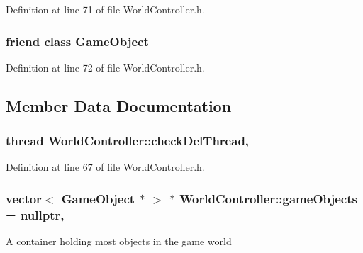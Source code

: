 Definition at line 71 of file World\-Controller.\-h.

\hypertarget{class_world_controller_a00df87c957d8f7ee0fc51f07a0542f4a}{
\subsubsection[{Game\-Object}]{\setlength{\rightskip}{0pt plus 5cm}friend class {\bf Game\-Object}\hspace{0.3cm}{\ttfamily [friend]}}}\label{class_world_controller_a00df87c957d8f7ee0fc51f07a0542f4a}


Definition at line 72 of file World\-Controller.\-h.



\subsection{Member Data Documentation}
\hypertarget{class_world_controller_ab8fb8ee7100a17d3a6237ce8ac5a15e2}{
\subsubsection[{check\-Del\-Thread}]{\setlength{\rightskip}{0pt plus 5cm}thread World\-Controller\-::check\-Del\-Thread\hspace{0.3cm}{\ttfamily [static]}, {\ttfamily [protected]}}}\label{class_world_controller_ab8fb8ee7100a17d3a6237ce8ac5a15e2}


Definition at line 67 of file World\-Controller.\-h.

\hypertarget{class_world_controller_a2cb2ca35d201d22f296cda71b8a58e92}{
\subsubsection[{game\-Objects}]{\setlength{\rightskip}{0pt plus 5cm}vector$<$ {\bf Game\-Object} $\ast$ $>$ $\ast$ World\-Controller\-::game\-Objects = nullptr\hspace{0.3cm}{\ttfamily [static]}, {\ttfamily [protected]}}}\label{class_world_controller_a2cb2ca35d201d22f296cda71b8a58e92}
A container holding most objects in the game world 

